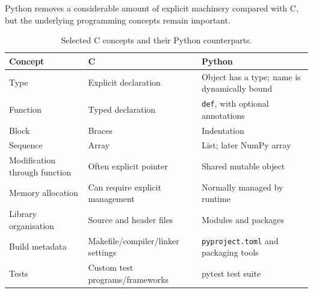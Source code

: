 Python removes a considerable amount of explicit machinery compared
with C, but the underlying programming concepts remain important.

\begin{table}[htbp]
    \centering

    \caption{Selected C concepts and their Python counterparts.}
    \label{tab:c-python-comparison}

    \begin{tabularx}{\textwidth}{@{} l X X @{}}
        \toprule

        \textbf{Concept} &
        \textbf{C} &
        \textbf{Python} \\

        \midrule

        Type &
        Explicit declaration &
        Object has a type; name is dynamically bound \\

        Function &
        Typed declaration &
        \texttt{def}, with optional annotations \\

        Block &
        Braces &
        Indentation \\

        Sequence &
        Array &
        List; later NumPy array \\

        Modification through function &
        Often explicit pointer &
        Shared mutable object \\

        Memory allocation &
        Can require explicit management &
        Normally managed by runtime \\

        Library organisation &
        Source and header files &
        Modules and packages \\

        Build metadata &
        Makefile/compiler/linker settings &
        \texttt{pyproject.toml} and packaging tools \\

        Tests &
        Custom test programs/frameworks &
        pytest test suite \\

        \bottomrule
    \end{tabularx}
\end{table}


